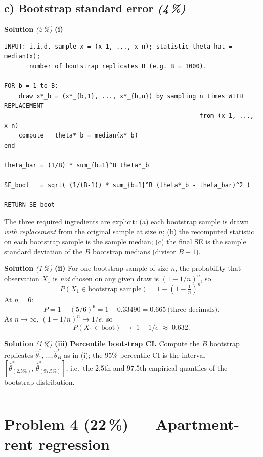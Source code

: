 \documentclass[11pt,a4paper]{article}
\newcommand{\points}[1]{\textbf{(#1\,\%)}}
\newcommand{\subpoints}[1]{\textit{(#1\,\%)}}
\newcommand{\sol}{\noindent\textbf{Solution}}
\begin{document}
\subsection*{c) Bootstrap standard error \subpoints{4}}

\sol{} \subpoints{2} \textbf{(i)}

{\small
\begin{verbatim}
INPUT: i.i.d. sample x = (x_1, ..., x_n); statistic theta_hat = median(x);
       number of bootstrap replicates B (e.g. B = 1000).

FOR b = 1 to B:
    draw x*_b = (x*_{b,1}, ..., x*_{b,n}) by sampling n times WITH REPLACEMENT
                                                      from (x_1, ..., x_n)
    compute   theta*_b = median(x*_b)
end

theta_bar = (1/B) * sum_{b=1}^B theta*_b

SE_boot   = sqrt( (1/(B-1)) * sum_{b=1}^B (theta*_b - theta_bar)^2 )

RETURN SE_boot
\end{verbatim}
}

\noindent The three required ingredients are explicit: (a) each bootstrap sample is drawn
\emph{with replacement} from the original sample at size $n$; (b) the recomputed statistic on each
bootstrap sample is the sample median; (c) the final SE is the sample standard deviation of the
$B$ bootstrap medians (divisor $B-1$).

\medskip
\sol{} \subpoints{1} \textbf{(ii)} For one bootstrap sample of size $n$, the probability that
observation $X_1$ is \emph{not} chosen on any given draw is $(1-1/n)^n$, so
$$P(X_1 \in \text{bootstrap sample}) = 1 - \left(1 - \tfrac{1}{n}\right)^n.$$
At $n=6$:
$$P = 1 - (5/6)^6 = 1 - 0.33490 = \boxed{0.665}\ \text{(three decimals)}.$$
As $n\to\infty$, $(1-1/n)^n \to 1/e$, so
$$P(X_1 \in \text{boot}) \;\longrightarrow\; 1 - 1/e \;\approx\; \boxed{0.632}.$$

\medskip
\sol{} \subpoints{1} \textbf{(iii)} \textbf{Percentile bootstrap CI.} Compute the $B$ bootstrap
replicates $\hat\theta^*_1,\dots,\hat\theta^*_B$ as in (i); the $95\%$ percentile CI is the
interval $[\hat\theta^*_{(2.5\%)},\,\hat\theta^*_{(97.5\%)}]$, i.e.\ the $2.5$th and $97.5$th
empirical quantiles of the bootstrap distribution.

\vspace{0.6em}
\hrule
\vspace{1em}

\section*{Problem 4 \points{22} --- Apartment-rent regression}
\end{document}
